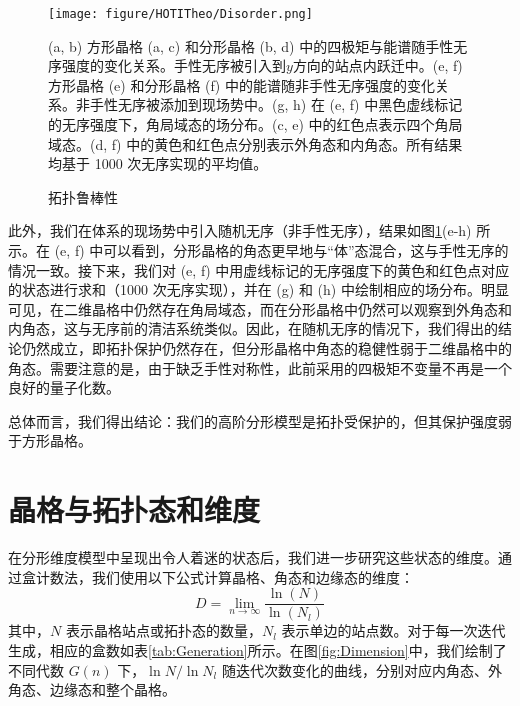 \begin{figure}[htbp]
    \centering
    \texttt{[image: figure/HOTITheo/Disorder.png]}
    \caption{拓扑鲁棒性}(a, b) 方形晶格 (a, c) 和分形晶格 (b, d) 中的四极矩与能谱随手性无序强度的变化关系。手性无序被引入到$y$方向的站点内跃迁中。(e, f) 方形晶格 (e) 和分形晶格 (f) 中的能谱随非手性无序强度的变化关系。非手性无序被添加到现场势中。(g, h) 在 (e, f) 中黑色虚线标记的无序强度下，角局域态的场分布。(c, e) 中的红色点表示四个角局域态。(d, f) 中的黄色和红色点分别表示外角态和内角态。所有结果均基于 1000 次无序实现的平均值。
    \label{fig:Disorder}
\end{figure}

此外，我们在体系的现场势中引入随机无序（非手性无序），结果如图\ref{fig:Disorder}(e-h) 所示。在 (e, f) 中可以看到，分形晶格的角态更早地与“体”态混合，这与手性无序的情况一致。接下来，我们对 (e, f) 中用虚线标记的无序强度下的黄色和红色点对应的状态进行求和（1000 次无序实现），并在 (g) 和 (h) 中绘制相应的场分布。明显可见，在二维晶格中仍然存在角局域态，而在分形晶格中仍然可以观察到外角态和内角态，这与无序前的清洁系统类似。因此，在随机无序的情况下，我们得出的结论仍然成立，即拓扑保护仍然存在，但分形晶格中角态的稳健性弱于二维晶格中的角态。需要注意的是，由于缺乏手性对称性，此前采用的四极矩不变量不再是一个良好的量子化数\cite{li2020topological}。

总体而言，我们得出结论：我们的高阶分形模型是拓扑受保护的，但其保护强度弱于方形晶格。

\section{晶格与拓扑态和维度}
在分形维度模型中呈现出令人着迷的状态后，我们进一步研究这些状态的维度。通过盒计数法\cite{Mandelbrot1982}，我们使用以下公式计算晶格、角态和边缘态的维度：
\begin{equation}
D = \lim_{n \to \infty} \frac{\ln (N)}{\ln (N_l)}
\label{eq:BoxCounting}
\end{equation}
其中，\( N \) 表示晶格站点或拓扑态的数量，\( N_l \) 表示单边的站点数。对于每一次迭代生成，相应的盒数如表\ref{tab:Generation}所示。在图\ref{fig:Dimension}中，我们绘制了不同代数 \( G(n) \) 下，\( \ln N / \ln N_l \) 随迭代次数变化的曲线，分别对应内角态、外角态、边缘态和整个晶格。

